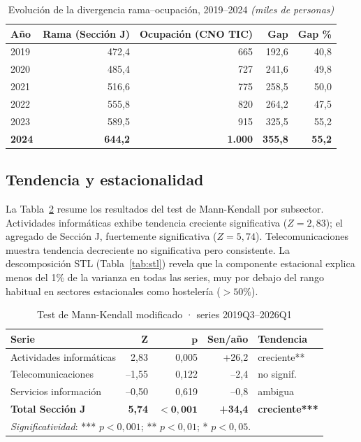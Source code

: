 \documentclass[11pt,a4paper]{article}
\begin{document}
\begin{table}[h]
\centering
\caption{Evolución de la divergencia rama--ocupación, 2019--2024
\textit{(miles de personas)}}
\label{tab:divergencia}
\begin{tabular}{lrrrr}
\toprule
\textbf{Año} & \textbf{Rama (Sección J)} & \textbf{Ocupación (CNO TIC)} & \textbf{Gap} & \textbf{Gap \%} \\
\midrule
2019 & 472,4 & 665 & 192,6 & 40,8 \\
2020 & 485,4 & 727 & 241,6 & 49,8 \\
2021 & 516,6 & 775 & 258,5 & 50,0 \\
2022 & 555,8 & 820 & 264,2 & 47,5 \\
2023 & 589,5 & 915 & 325,5 & 55,2 \\
\textbf{2024} & \textbf{644,2} & \textbf{1.000} & \textbf{355,8} & \textbf{55,2} \\
\bottomrule
\end{tabular}
\end{table}

\subsection{Tendencia y estacionalidad}

La Tabla~\ref{tab:mk} resume los resultados del test de Mann-Kendall por
subsector. Actividades informáticas exhibe tendencia creciente significativa
($Z=2{,}83$); el agregado de Sección J, fuertemente significativa ($Z=5{,}74$).
Telecomunicaciones muestra tendencia decreciente no significativa pero
consistente. La descomposición STL (Tabla~\ref{tab:stl}) revela que la
componente estacional explica menos del 1\% de la varianza en todas las series,
muy por debajo del rango habitual en sectores estacionales como hostelería
($> 50\%$).

\begin{table}[h]
\centering
\caption{Test de Mann-Kendall modificado · series 2019Q3--2026Q1}
\label{tab:mk}
\begin{tabular}{lrrrl}
\toprule
\textbf{Serie} & $\boldsymbol{Z}$ & $\boldsymbol{p}$ & \textbf{Sen/año} & \textbf{Tendencia} \\
\midrule
Actividades informáticas & 2,83 & 0,005 & +26,2 & creciente** \\
Telecomunicaciones       & --1,55 & 0,122 & --2,4 & no signif. \\
Servicios información    & --0,50 & 0,619 & --0,8 & ambigua \\
\textbf{Total Sección J} & \textbf{5,74} & $\boldsymbol{<0{,}001}$ & \textbf{+34,4} & \textbf{creciente***} \\
\bottomrule
\multicolumn{5}{l}{\footnotesize\textit{Significatividad}: *** $p<0{,}001$; ** $p<0{,}01$; * $p<0{,}05$.}
\end{tabular}
\end{table}
\end{document}
